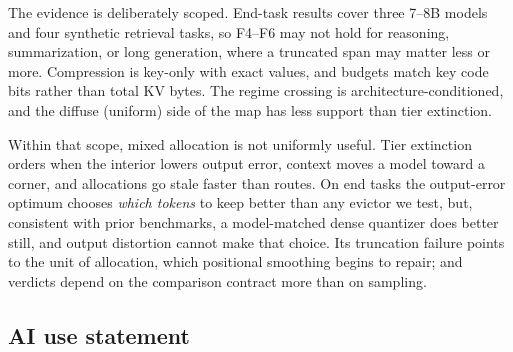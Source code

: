 \documentclass{article}
\newif\ifshowest \showesttrue
\DeclareRobustCommand{\estonly}[1]{\ifshowest#1\else\ifhmode\unskip\fi\fi}
\theoremstyle{definition}
\begin{document}
The evidence is deliberately scoped.  
End-task results cover three 7--8B models and four synthetic retrieval tasks, 
so F4--F6 may not hold for reasoning, summarization, or long generation, where a truncated span may matter less or more.  
Compression is key-only with exact values, and budgets match key code bits rather than total KV bytes. %
The regime crossing is architecture-conditioned, and the diffuse (uniform) side of the map has less support than tier extinction.

Within that scope, mixed allocation is not uniformly useful.  Tier extinction orders when the interior lowers output error, context moves a model toward a corner, and allocations go stale faster than routes.  
On end tasks the output-error optimum chooses \emph{which tokens} to keep better than any evictor we test, but, consistent with prior benchmarks, a model-matched dense quantizer does better still, and output distortion cannot make that choice.  
Its truncation failure points to the unit of allocation, which positional smoothing begins to repair; and verdicts depend on the comparison contract more than on sampling.

\label{main:end}

\subsection*{AI use statement}
\end{document}
